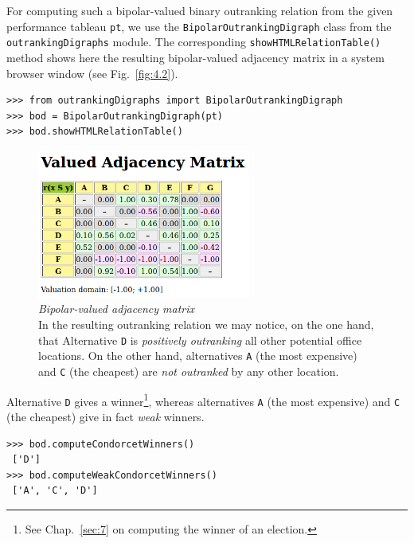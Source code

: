 For computing such a bipolar-valued binary outranking relation from the given performance tableau \texttt{pt}, we use the \texttt{BipolarOutrankingDigraph} class from the \texttt{outrankingDigraphs} module. The corresponding
\texttt{showHTMLRe\-lation\-Table()} method shows here the resulting bipolar-valued adjacency matrix in a system browser window (see Fig.~\vref{fig:4.2}).
\begin{lstlisting}[caption={Computing a bipolar-valued outranking digraph},label=list:4.3]
>>> from outrankingDigraphs import BipolarOutrankingDigraph
>>> bod = BipolarOutrankingDigraph(pt)
>>> bod.showHTMLRelationTable()
\end{lstlisting}
\begin{figure}[ht]
\sidecaption[t]
\includegraphics[width=7cm]{Figures/4-2-officeChoiceOutranking.png}
\caption[Bipolar-valued adjacency matrix]{\emph{Bipolar-valued adjacency matrix}\\ In the resulting outranking relation we may notice, on the one hand, that Alternative \texttt{D} is \emph{positively outranking} all other potential office locations. On the other hand, alternatives \texttt{A} (the most expensive) and \texttt{C} (the cheapest) are \emph{not outranked} by any other location.}
\label{fig:4.2}       %
\end{figure}

Alternative \texttt{D} gives a \Condorcet winner\footnote{See Chap.~\ref{sec:7} on computing the winner of an election.}, whereas alternatives \texttt{A} (the most expensive) and \texttt{C} (the cheapest) give in fact \emph{weak} \Condorcet winners.
\begin{lstlisting}
>>> bod.computeCondorcetWinners()
 ['D']
>>> bod.computeWeakCondorcetWinners()
 ['A', 'C', 'D']
\end{lstlisting}

